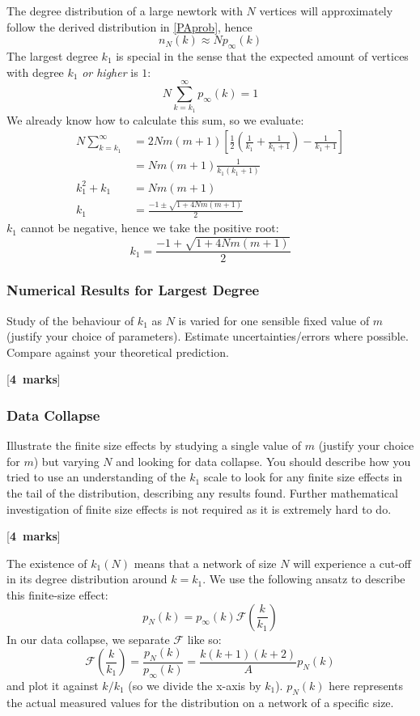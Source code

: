 \documentclass[a4paper,12pt]{article}
\newcounter{nmarks}
\newcommand{\qmarks}[1]{\addtocounter{nmarks}{#1} }
\renewcommand{\qmarks}[1]{\addtocounter{nmarks}{#1} \hspace*{\fill} [\textbf{#1~marks}]}
\begin{document}
The degree distribution of a large newtork with $N$ vertices will approximately follow the derived distribution in \ref{PAprob}, hence
$$n_N(k)\approx Np_\infty(k)$$
The largest degree $k_1$ is special in the sense that the expected amount of vertices with degree $k_1$ \textit{or higher} is $1$:
\begin{equation} \label{MaximumDegree}
N\sum_{k=k_1}^\infty p_\infty(k)=1
\end{equation}
We already know how to calculate this sum, so we evaluate:
\begin{align*}
N\sum_{k=k_1}^\infty &= 2Nm(m+1)\left[\frac{1}{2}\left(\frac{1}{k_1}+\frac{1}{k_1+1}\right)-\frac{1}{k_1+1}\right]\\
&=Nm(m+1)\frac{1}{k_1(k_1+1)}\\
k_1^2+k_1 &= Nm(m+1)\\
k_1 &= \frac{-1\pm\sqrt{1+4Nm(m+1)}}{2}
\end{align*}
$k_1$ cannot be negative, hence we take the positive root:
\begin{equation} \label{MaximumDegreePA}
k_1 = \frac{-1+\sqrt{1+4Nm(m+1)}}{2}
\end{equation}

\subsubsection{Numerical Results for Largest Degree}
Study of the behaviour of $k_1$ as $N$ is varied for one sensible fixed value of $m$ (justify your choice of parameters). Estimate uncertainties/errors where possible. Compare against your theoretical prediction. \qmarks{4}

\subsubsection{Data Collapse}
Illustrate the finite size effects by studying a single value of $m$ (justify your choice for $m$) but varying $N$ and looking for data collapse. You should describe how you tried to use an understanding of the $k_1$ scale to look for any finite size effects in the tail of the distribution, describing any results found. Further mathematical investigation of finite size effects is not required as it is extremely hard to do. \qmarks{4}

The existence of $k_1(N)$ means that a network of size $N$ will experience a cut-off in its degree distribution around $k=k_1$. We use the following ansatz to describe this finite-size effect:
\begin{equation} \label{FiniteSizeAnsatz}
p_N(k)=p_\infty(k)\mathcal{F}\left(\frac{k}{k_1}\right)
\end{equation}
In our data collapse, we separate $\mathcal{F}$ like so:
$$\mathcal{F}\left(\frac{k}{k_1}\right)=\frac{p_N(k)}{p_\infty(k)}=\frac{k(k+1)(k+2)}{A}p_N(k)$$
and plot it against $k/k_1$ (so we divide the x-axis by $k_1$). $p_N(k)$ here represents the actual measured values for the distribution on a network of a specific size.
\end{document}
